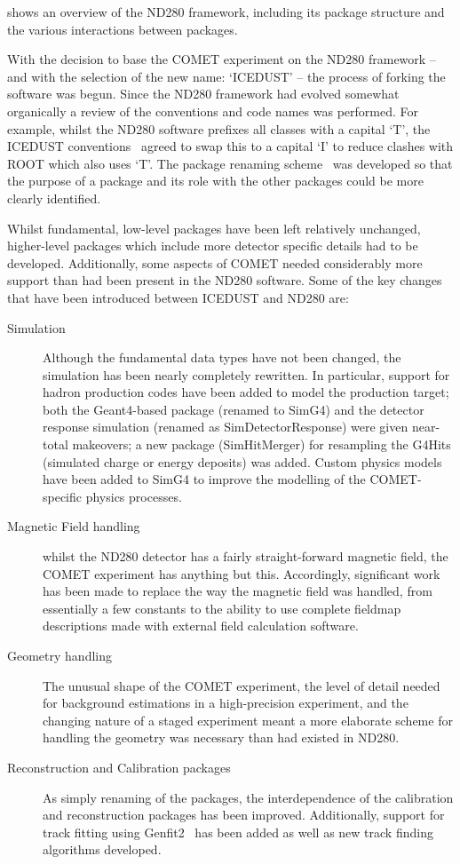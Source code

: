 \FigNDTwoEighty
{} shows an overview of the ND280 framework, including its package structure and the various interactions between packages.

With the decision to base the COMET experiment on the ND280 framework -- and with the selection of the new name: `ICEDUST' -- the process of forking the software was begun.
Since the ND280 framework had evolved somewhat organically a review of the conventions and code names was performed.
For example, whilst the ND280 software prefixes all classes with a capital `T', the ICEDUST conventions~\cite{ID:conventions} agreed to swap this to a capital `I' to reduce clashes with ROOT which also uses `T'.
The package renaming scheme~\cite{ID:ForkingDocs} was developed so that the purpose of a package and its role with the other packages could be more clearly identified.

Whilst fundamental, low-level packages have been left relatively unchanged, higher-level packages which include more detector specific details had to be developed.
Additionally, some aspects of COMET needed considerably more support than had been present in the ND280 software.
Some of the key changes that have been introduced between ICEDUST and ND280 are:
\begin{description}
	\item [Simulation] Although the fundamental data types have not been changed, the simulation has been nearly completely rewritten.
		In particular, support for hadron production codes have been added to model the production target;
		both the Geant4-based package (renamed to SimG4) and the detector response simulation (renamed as SimDetectorResponse) were given near-total makeovers;
		a new package (SimHitMerger) for resampling the G4Hits (simulated charge or energy deposits) was added.
		Custom physics models have been added to SimG4 to improve the modelling of the COMET-specific physics processes.
	\item [Magnetic Field handling]  whilst the ND280 detector has a fairly straight-forward magnetic field, the COMET experiment has anything but this.  
		Accordingly, significant work has been made to replace the way
		the magnetic field was handled, from essentially a few constants
		to the ability to use complete fieldmap descriptions made with
		external field calculation software.
	\item [Geometry handling] The unusual shape of the COMET experiment, the level of detail needed for background estimations in a high-precision experiment, and the changing nature of a staged experiment meant a more elaborate scheme for handling the geometry was necessary than had existed in ND280.
	\item [Reconstruction and Calibration packages] As simply renaming of the packages, the interdependence of the calibration and reconstruction packages has been improved.
		Additionally, support for track fitting using Genfit2~\cite{genfit-Hoppner:2009af} has been added as well as new track finding algorithms developed.
\end{description}

